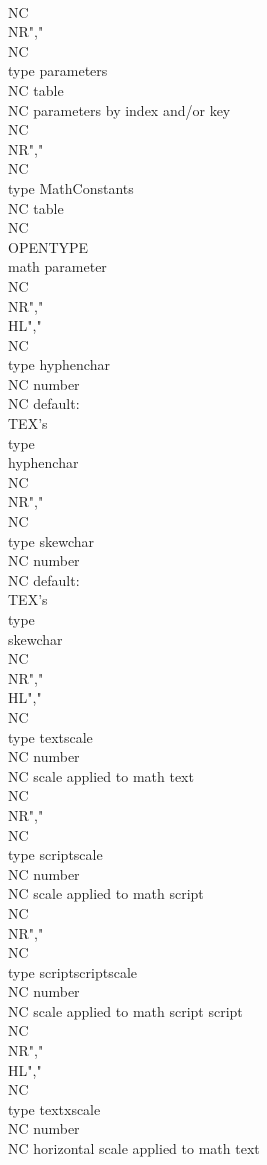           \\NC \\NR","\\NC \\type {parameters}         \\NC table   \\NC parameters by index and/or key  \\NC \\NR","\\NC \\type {MathConstants}      \\NC table   \\NC \\OPENTYPE\\ math parameter       \\NC \\NR","\\HL","\\NC \\type {hyphenchar}         \\NC number  \\NC default: \\TEX's \\type {\\hyphenchar} \\NC \\NR","\\NC \\type {skewchar}           \\NC number  \\NC default: \\TEX's \\type {\\skewchar}   \\NC \\NR","\\HL","\\NC \\type {textscale}          \\NC number  \\NC scale applied to math text          \\NC \\NR","\\NC \\type {scriptscale}        \\NC number  \\NC scale applied to math script        \\NC \\NR","\\NC \\type {scriptscriptscale}  \\NC number  \\NC scale applied to math script script \\NC \\NR","\\HL","\\NC \\type {textxscale}         \\NC number  \\NC horizontal scale applied to math text          \\